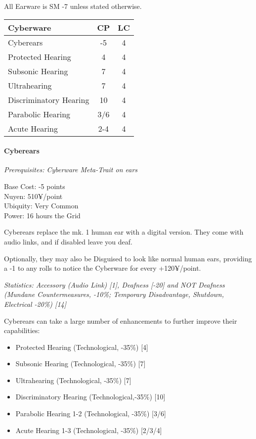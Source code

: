 \begin{multicols*}{3}
	All Earware is SM -7 unless stated otherwise.
	
	\begin{center}
		\begin{tabularx}{0.32\textwidth}{|X|c|c|}
			\hline
			Cyberware & CP & LC\\
			\hline
			\hline
			Cyberears & -5 & 4 \\
			\hline
			Protected Hearing & 4 & 4 \\
			Subsonic Hearing & 7 & 4 \\
			Ultrahearing & 7 & 4 \\
			Discriminatory Hearing & 10 & 4 \\
			Parabolic Hearing & 3/6 & 4 \\
			Acute Hearing & 2-4 & 4 \\
			\hline
		\end{tabularx}
	\end{center}
	
	\paragraph{Cyberears}
	\textit{Prerequisites: Cyberware Meta-Trait on ears}
	\begin{flushright}
		Base Cost: -5 points\\
		Nuyen: 510¥/point\\
		Ubiquity: Very Common\\
		Power: 16 hours the Grid\\
	\end{flushright}
	
	Cyberears replace the mk. 1 human ear with a digital version. They come with audio links, and if disabled leave you deaf.
	
	Optionally, they may also be Disguised to look like normal human ears, providing a -1 to any rolls to notice the Cyberware for every +120¥/point.
	
	\textit{\textcolor{OliveGreen}{Statistics: Accessory (Audio Link) [1], Deafness [-20] and NOT Deafness (Mundane Countermeasures, -10\%; Temporary Disadvantage, Shutdown, Electrical -20\%) [14]}}
	
	Cyberears can take a large number of enhancements to further improve their capabilities: 
	
	\begin{itemize}
		\item Protected Hearing (Technological, -35\%) [4]
		\item Subsonic Hearing (Technological, -35\%) [7]
		\item Ultrahearing (Technological, -35\%) [7]
		\item Discriminatory Hearing (Technological,-35\%) [10]
		\item Parabolic Hearing 1-2 (Technological, -35\%) [3/6]
		\item Acute Hearing 1-3 (Technological, -35\%) [2/3/4]
	\end{itemize}


\end{multicols*}
